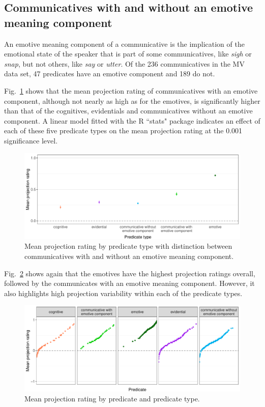 \documentclass[11pt,fleqn]{article}
\newcommand{\figref}[1]{Fig.~\ref{#1}}
\newcommand{\6}{\mbox{$[\hspace*{-.6mm}[$}}
\newcommand{\9}{\mbox{$]\hspace*{-.6mm}]$}}
\begin{document}
\subsection{Communicatives with and without an emotive meaning component}

An emotive meaning component of a communicative is the implication of the emotional state of the speaker that is part of some communicatives, like \emph{sigh} or \emph{snap}, but not others, like \emph{say} or \emph{utter}. Of the 236 communicatives in the MV data set, 47 predicates have an emotive component and 189 do not.

\figref{projpredtype2} shows that the mean projection rating of communicatives with an emotive component, although not nearly as high as for the emotives, is significantly higher than that of the cognitives, evidentials and communicatives without an emotive component. A linear model fitted with the R ``stats" package indicates an effect of each of these five predicate types on the mean projection rating at the 0.001 significance level.

\begin{figure}[H]
	\centering
	\includegraphics[width=1\textwidth]{projection-by-predicateType2}
	\caption{Mean projection rating by predicate type with distinction between communicatives with and without an emotive meaning component.}
	\label{projpredtype2}
\end{figure}

\figref{projpred} shows again that the emotives have the highest projection ratings overall, followed by the communicates with an emotive meaning component. However, it also highlights high projection variability within each of the predicate types.

\begin{figure}[H]
	\centering
	\includegraphics[width=\textwidth]{projection-by-predicate-faceted2}
	\caption{Mean projection rating by predicate and predicate type.}
	\label{projpred}
\end{figure}
\end{document}
